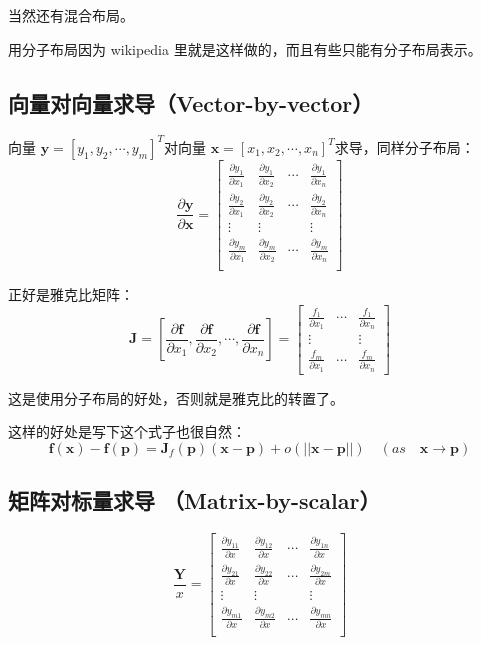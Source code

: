 \documentclass[12pt]{article}
\begin{document}
当然还有混合布局。

用分子布局因为 wikipedia 里就是这样做的，而且有些只能有分子布局表示。

\subsection{向量对向量求导（Vector-by-vector）}
向量 $\mathbf{y} = [y_1, y_2, \cdots, y_m]^T$对向量 $\mathbf{x} = [x_1, x_2, \cdots, x_n]^T$求导，同样分子布局：
$$
\frac{\partial \mathbf{y}}{\partial \mathbf{x}} = 
\begin{bmatrix}
    \frac{\partial y_1}{\partial x_1} &
    \frac{\partial y_1}{\partial x_2} & 
    \cdots &
    \frac{\partial y_1}{\partial x_n} \\
    \frac{\partial y_2}{\partial x_1} &
    \frac{\partial y_2}{\partial x_2} & 
    \cdots &
    \frac{\partial y_2}{\partial x_n} \\
    \vdots & \vdots &  & \vdots \\
    \frac{\partial y_m}{\partial x_1} &
    \frac{\partial y_m}{\partial x_2} & 
    \cdots &
    \frac{\partial y_m}{\partial x_n} \\
\end{bmatrix}
$$

正好是雅克比矩阵：
$$
\mathbf{J} = [
\frac{\partial \mathbf{f}}{\partial x_1}, 
\frac{\partial \mathbf{f}}{\partial x_2},
\cdots,
\frac{\partial \mathbf{f}}{\partial x_n}] = 
\begin{bmatrix}
    \frac{f_1}{\partial x_1} &
    \cdots &
    \frac{f_1}{\partial x_n} \\
    \vdots &  & \vdots \\
    \frac{f_m}{\partial x_1} &
    \cdots &
    \frac{f_m}{\partial x_n}
\end{bmatrix}
$$

这是使用分子布局的好处，否则就是雅克比的转置了。

这样的好处是写下这个式子也很自然：
$$
\mathbf{f}(\mathbf{x}) - \mathbf{f}(\mathbf{p}) = \mathbf{J}_f(\mathbf{p})(\mathbf{x}-\mathbf{p}) + o(||\mathbf{x} - \mathbf{p}||) \quad (as \quad \mathbf{x} \rightarrow \mathbf{p})
$$

\subsection{矩阵对标量求导 （Matrix-by-scalar）
}
$$
\frac{\mathbf{Y}}{x} = 
\begin{bmatrix}
    \frac{\partial y_{11}}{\partial x} &
    \frac{\partial y_{12}}{\partial x} & 
    \cdots &
    \frac{\partial y_{1n}}{\partial x} \\
    \frac{\partial y_{21}}{\partial x} &
    \frac{\partial y_{22}}{\partial x} & 
    \cdots &
    \frac{\partial y_{2m}}{\partial x} \\
    \vdots & \vdots &   & \vdots \\
    \frac{\partial y_{m1}}{\partial x} &
    \frac{\partial y_{m2}}{\partial x} & 
    \cdots &
    \frac{\partial y_{mn}}{\partial x} \\
\end{bmatrix}
$$
\end{document}

